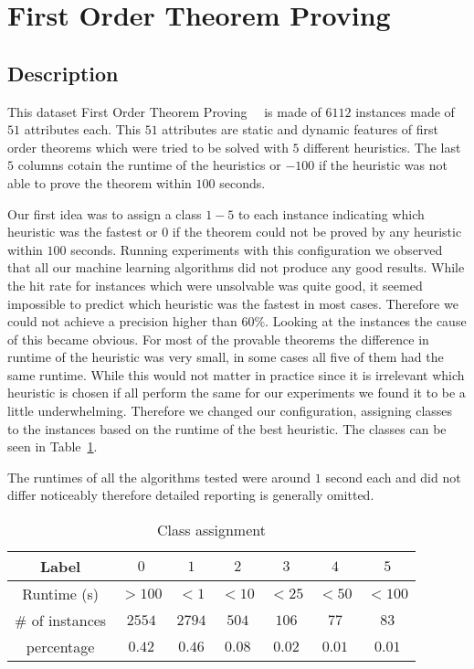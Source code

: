 \section{First Order Theorem Proving}
\label{db:sec:ds2}
\subsection{Description}
This dataset First Order Theorem Proving~\cite{ds2:uci}~\cite{ds2:paper} is made of $6112$ instances made of $51$ attributes each. This $51$ attributes are static and dynamic features of first order theorems which were tried to be solved with $5$ different heuristics. The last $5$ columns cotain the runtime of the heuristics or $-100$ if the heuristic was not able to prove the theorem within $100$ seconds.\par
Our first idea was to assign a class $1-5$ to each instance indicating which heuristic was the fastest or $0$ if the theorem could not be proved by any heuristic within $100$ seconds. Running experiments with this configuration we observed that all our machine learning algorithms did not produce any good results. While the hit rate for instances which were unsolvable was quite good, it seemed impossible to predict which heuristic was the fastest in most cases. Therefore we could not achieve a precision higher than $60\%$.
Looking at the instances the cause of this became obvious. For most of the provable theorems the difference in runtime of the heuristic was very small, in some cases all five of them had the same runtime. While this would not matter in practice since it is irrelevant which heuristic is chosen if all perform the same for our experiments we found it to be a little underwhelming. Therefore we changed our configuration, assigning classes to the instances based on the runtime of the best heuristic. The classes can be seen in Table~\ref{ds2:table:classes}.
\par The runtimes of all the algorithms tested were around $1$ second each and did not differ noticeably therefore detailed reporting is generally omitted.
\begin{table}[h]
	\begin{center}
	\begin{tabular}{c|c|c|c|c|c|c}

		Label & $0$ & $1$ & $2$ & $3$ & $4$ & $5$\\\hline
		Runtime (s) & $>100$ & $<1$ & $<10$ & $<25$ & $<50$ &$<100$\\\hline
		$\#$ of instances & $2554$ & $2794$ & $504$ & $106$ & $77$ & $83$\\\hline
		percentage & $0.42$ & $0.46$ & $0.08$ & $0.02$ & $0.01$ & $0.01$\\\hline

	\end{tabular}
\end{center}
	\caption{Class assignment \label{ds2:table:classes}}
\end{table}
